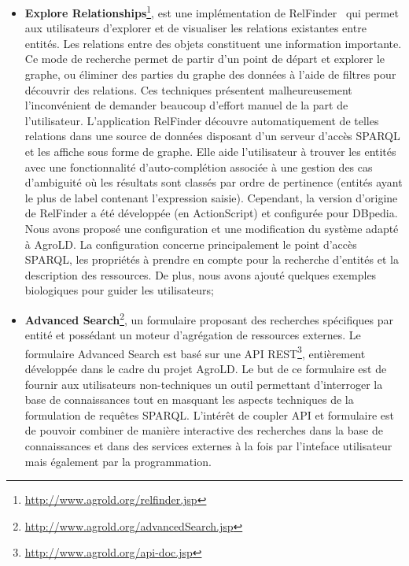 \begin{itemize}
\item \textbf{Explore Relationships}\footnote{\url{http://www.agrold.org/relfinder.jsp}}, est une implémentation de RelFinder~\cite{relfinder} qui permet aux utilisateurs d’explorer et de visualiser les relations existantes entre entités. Les relations entre des objets constituent une information importante. Ce mode de recherche permet de partir d’un point de départ et explorer le graphe, ou éliminer des parties du graphe des données à l’aide de filtres pour découvrir des relations. Ces techniques présentent malheureusement l’inconvénient de demander beaucoup d’effort manuel de la part de l’utilisateur. L’application RelFinder découvre automatiquement de telles relations dans une source de données disposant d’un serveur d’accès SPARQL et les affiche sous forme de graphe. Elle aide l’utilisateur à trouver les entités avec une fonctionnalité d’auto-complétion associée à une gestion des cas d’ambiguité où les résultats sont classés par ordre de pertinence (entités ayant le plus de label contenant l’expression saisie). Cependant, la version d'origine de RelFinder a été développée (en ActionScript) et configurée pour DBpedia. Nous avons proposé une configuration et une modification du système adapté à AgroLD. La configuration concerne principalement le point d’accès SPARQL, les propriétés à prendre en compte pour la recherche d’entités et la description des ressources. De plus, nous avons ajouté quelques exemples biologiques pour guider les utilisateurs;\\
\item \textbf{Advanced Search}\footnote{\url{http://www.agrold.org/advancedSearch.jsp}}, un formulaire proposant des recherches spécifiques par entité et possédant un moteur d'agrégation de ressources externes. Le formulaire Advanced Search est basé sur une API REST\footnote{\url{http://www.agrold.org/api-doc.jsp}}, entièrement développée dans le cadre du projet AgroLD. Le but de ce formulaire est de fournir aux utilisateurs non-techniques un outil permettant d’interroger la base de connaissances tout en masquant les aspects techniques de la formulation de requêtes SPARQL. L'intérêt de coupler API et formulaire est de pouvoir combiner de manière interactive des recherches dans la base de connaissances et dans des services externes à la fois par l'inteface utilisateur mais également par la programmation.\\

\end{itemize}

